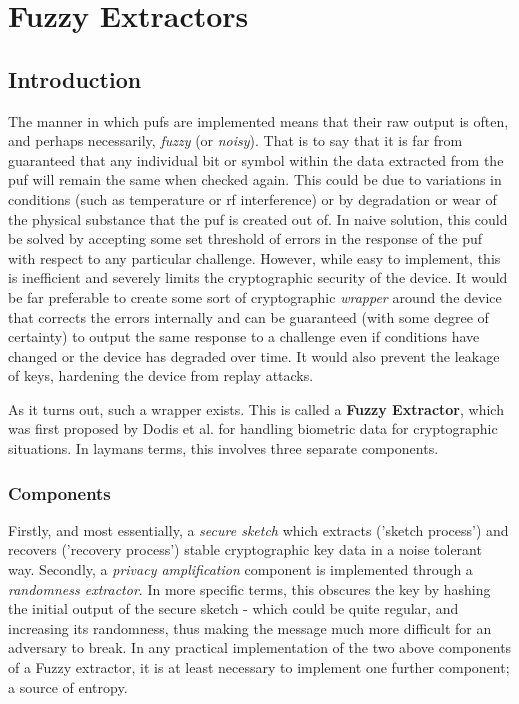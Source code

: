 \section{Fuzzy Extractors}

\subsection{Introduction}

The manner in which \glspl{puf} are implemented means that their raw
output is often, and perhaps necessarily, \emph{fuzzy} (or \emph{noisy}).
That is to say that it is far from guaranteed that any individual bit or
symbol within the data extracted from the \gls{puf} will remain the same when checked
again.
This could be due to variations in conditions (such as temperature or
\gls{rf} interference) or by degradation or wear of the physical substance that the
\gls{puf} is created out of.
In naive solution, this could be solved by accepting some set threshold of
errors in the response of the \gls{puf} with respect to any particular challenge.
However, while easy to implement, this is inefficient and severely limits
the cryptographic security of the device.
It would be far preferable to create some sort of cryptographic \emph{wrapper}
around the device that corrects the errors internally and can be guaranteed
(with some degree of certainty) to output the same response to a challenge even
if conditions have changed or the device has degraded over time.
It would also prevent the leakage of keys, hardening the device from replay attacks.

As it turns out, such a wrapper exists. This is called a \textbf{Fuzzy Extractor}, which
was first proposed by Dodis et al.\cite{dodis2004fuzzy} for handling biometric
data for cryptographic situations.
In laymans terms, this involves three separate components.

\subsubsection{Components}

Firstly, and most essentially, a \emph{secure sketch} which extracts
('sketch process') and recovers ('recovery process') stable
cryptographic key data in a noise tolerant way.
Secondly, a \emph{privacy amplification} component is implemented through
a \emph{randomness extractor}.
In more specific terms, this obscures the key by hashing the initial
output of the secure sketch - which could be quite regular, and increasing its
randomness, thus making the message much more difficult for an adversary to break.
In any practical implementation of the two above components of a Fuzzy extractor,
it is at least necessary to implement one further component; a source of entropy.

